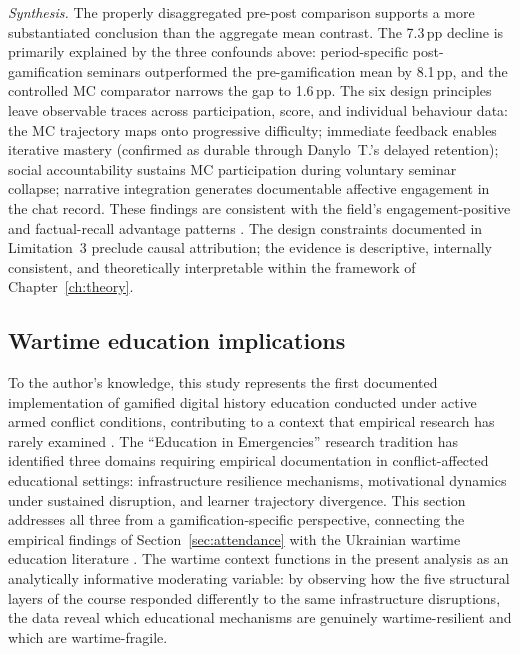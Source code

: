 \textit{Synthesis.} The properly disaggregated pre-post comparison supports a more substantiated conclusion than the aggregate mean contrast. The 7.3\,pp decline is primarily explained by the three confounds above: period-specific post-gamification seminars outperformed the pre-gamification mean by 8.1\,pp, and the controlled MC comparator narrows the gap to 1.6\,pp. The six design principles leave observable traces across participation, score, and individual behaviour data: the MC trajectory maps onto progressive difficulty; immediate feedback enables iterative mastery (confirmed as durable through Danylo~T.'s delayed retention); social accountability sustains MC participation during voluntary seminar collapse; narrative integration generates documentable affective engagement in the chat record. These findings are consistent with the field's engagement-positive and factual-recall advantage patterns \cite{KorniienkoSemerikov2024}. The design constraints documented in Limitation~3 preclude causal attribution; the evidence is descriptive, internally consistent, and theoretically interpretable within the framework of Chapter~\ref{ch:theory}.

\subsection{Wartime education implications}

To the author's knowledge, this study represents the first documented implementation of gamified digital history education conducted under active armed conflict conditions, contributing to a context that empirical research has rarely examined \cite{Burde2017, Kirk2007}. The ``Education in Emergencies'' research tradition \cite{Burde2017} has identified three domains requiring empirical documentation in conflict-affected educational settings: infrastructure resilience mechanisms, motivational dynamics under sustained disruption, and learner trajectory divergence. This section addresses all three from a gamification-specific perspective, connecting the empirical findings of Section~\ref{sec:attendance} with the Ukrainian wartime education literature \cite{Martynets202428, Ovcharuk2023, Zamkova2023299}. The wartime context functions in the present analysis as an analytically informative moderating variable: by observing how the five structural layers of the course responded differently to the same infrastructure disruptions, the data reveal which educational mechanisms are genuinely wartime-resilient and which are wartime-fragile.

